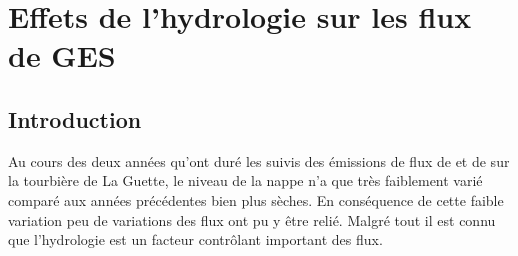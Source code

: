\chapter{Effets de l'hydrologie sur les flux de GES}
\label{ch:4}

\minitoc

\newpage

\section{Introduction}

Au cours des deux années qu'ont duré les suivis des émissions de flux de \coo et de \chh sur la tourbière de La Guette, le niveau de la nappe n'a que très faiblement varié comparé aux années précédentes bien plus sèches.
En conséquence de cette faible variation peu de variations des flux ont pu y être relié.
Malgré tout il est connu que l'hydrologie est un facteur contrôlant important des flux.

